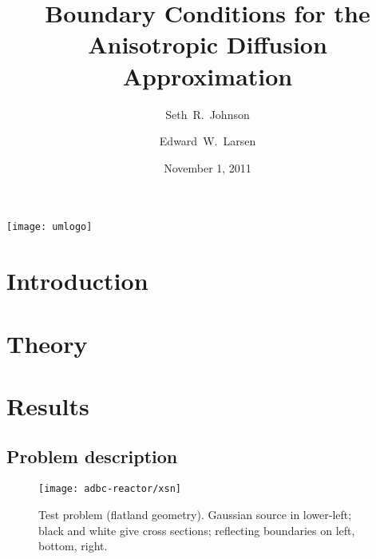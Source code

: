 \documentclass{beamer}
\title[AD BCs]%
{Boundary Conditions for the Anisotropic Diffusion Approximation}
\author[SRJ, EWL]{Seth~R.~Johnson \and Edward~W.~Larsen}
\institute[UMich]{
University of Michigan, Ann Arbor
}
\date[11/1/2011]{November 1, 2011}
\begin{document}

\begin{frame}
\titlepage
\begin{center}
  \texttt{[image: umlogo]}
\end{center}
\end{frame}

\section{Introduction}
\begin{frame}
\end{frame}

\section{Theory}
\begin{frame}
\end{frame}

\section{Results}

\subsection{Problem description}
\begin{frame}
\begin{figure}[tb]
  \texttt{[image: adbc-reactor/xsn]}

  \caption{Test problem (flatland geometry). Gaussian source in lower-left;
  black and white give cross sections; reflecting boundaries on left, bottom,
  right.}
  \label{fig:problem}
\end{figure}
\end{frame}
  
\end{document}

